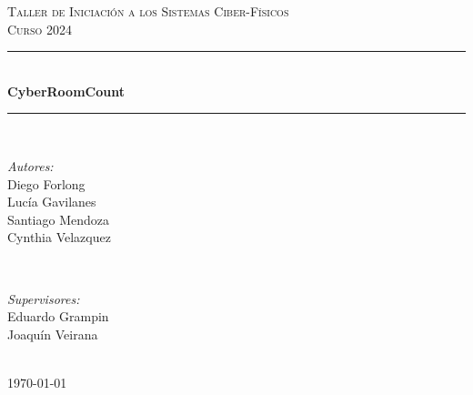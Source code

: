 \documentclass[12pt]{article} %
\begin{document}

\begin{titlepage}

\newcommand{\HRule}{\rule{\linewidth}{0.5mm}} %

\center %

\textsc{\LARGE Taller de Iniciación a los Sistemas Ciber-Físicos}\\[1.5cm] %
\textsc{\Large Curso 2024}\\[0.5cm] %

\HRule \\[0.4cm]
{ \huge \bfseries CyberRoomCount}\\[0.4cm] %
\HRule \\[1.5cm]

\begin{minipage}{0.4\textwidth}
\begin{flushleft} \large
\emph{Autores:}\\
Diego Forlong \textsc{}\\ %
Lucía Gavilanes  \textsc{}\\ %
Santiago Mendoza \textsc{}\\ %
Cynthia Velazquez \textsc{}\\ %
\end{flushleft}
\end{minipage}
~
\begin{minipage}{0.4\textwidth}
\begin{flushright} \large
\emph{Supervisores:} \\
Eduardo Grampin \textsc{}%
\\
Joaquín Veirana \textsc{}
\end{flushright}
\end{minipage}\\[4cm]

{\large \today}\\[3cm] %


\vfill %

\end{titlepage}
\end{document}

